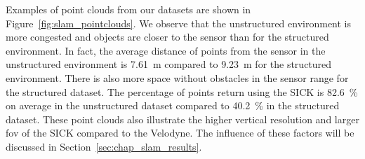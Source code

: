 Examples of point clouds from our datasets are shown in Figure~\ref{fig:slam_pointclouds}. We observe that the unstructured environment is more congested and objects are closer to the sensor than for the structured environment. In fact, the average distance of points from the sensor in the unstructured environment is \SI{7.61}{\meter} compared to \SI{9.23}{\meter} for the structured environment. There is also more space without obstacles in the sensor range for the structured dataset. The percentage of points return using the SICK is \SI{82.6}{\percent} on average in the unstructured dataset compared to \SI{40.2}{\percent} in the structured dataset. These point clouds also illustrate the higher vertical resolution and larger \gls*{fov} of the SICK compared to the Velodyne. The influence of these factors will be discussed in Section~\ref{sec:chap_slam_results}.


